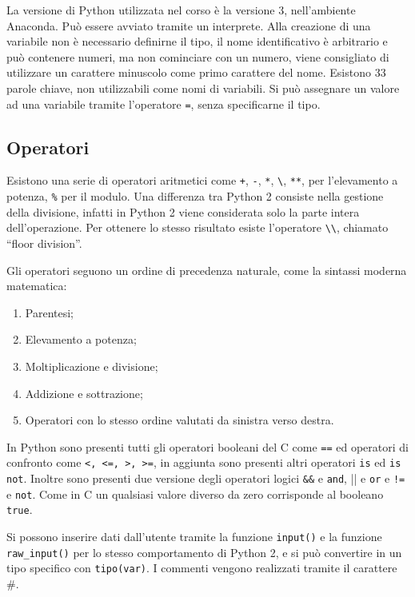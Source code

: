 \documentclass{article}
\numberwithin{equation}{subsection}
\begin{document}
La versione di Python utilizzata nel corso è la versione 3, nell'ambiente Anaconda. Può essere avviato tramite un interprete. Alla creazione di una variabile non 
è necessario definirne il tipo, il nome identificativo è arbitrario e può contenere numeri, ma non cominciare con un numero, viene consigliato di utilizzare un carattere 
minuscolo come primo carattere del nome. Esistono 33 parole chiave, non utilizzabili come nomi di variabili. Si può assegnare un valore ad una variabile tramite l'operatore 
\verb|=|, senza specificarne il tipo. 

\subsection{Operatori}

Esistono una serie di operatori aritmetici come \verb|+|, \verb|-|, \verb|*|, \verb|\|, \verb|**|, per l'elevamento a potenza, \verb|%| per il modulo. Una differenza 
tra Python 2 consiste nella gestione della divisione, infatti in Python 2 viene considerata solo la parte intera dell'operazione. Per ottenere lo stesso risultato 
esiste l'operatore \verb|\\|, chiamato ``floor division''. 

Gli operatori seguono un ordine di precedenza naturale, come la sintassi moderna matematica:
\begin{enumerate}
    \item Parentesi;
    \item Elevamento a potenza;
    \item Moltiplicazione e divisione;
    \item Addizione e sottrazione;
    \item Operatori con lo stesso ordine valutati da sinistra verso destra. 
\end{enumerate}

In Python sono presenti tutti gli operatori booleani del C come \verb|==| ed operatori di confronto come \verb|<, <=, >, >=|, in aggiunta sono presenti 
altri operatori \verb|is| ed \verb|is not|. Inoltre sono presenti due versione degli operatori logici \verb|&&| e \verb|and|, || e \verb|or| e \verb|!=| e \verb|not|. 
Come in C un qualsiasi valore diverso da zero corrisponde al booleano \verb|true|. 

Si possono inserire dati dall'utente tramite la funzione \verb|input()| e la funzione \verb|raw_input()| per lo stesso comportamento di Python 2, e si può convertire in un tipo 
specifico con \verb|tipo(var)|. I commenti vengono realizzati tramite il carattere \#. 
\end{document}
